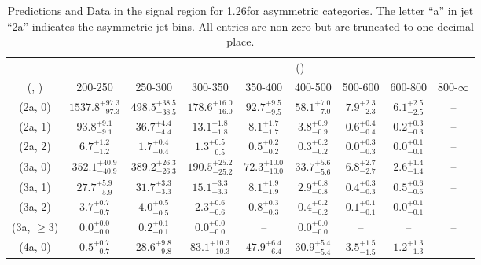 \begin{table}[h!]
\tiny
\centering
\caption{Predictions and Data in the signal region for 1.26\ifb for asymmetric categories. The letter ``a'' in jet \eg ``2a''  indicates the asymmetric jet bins. All entries are non-zero but are truncated to one decimal place.\label{tab:yieldsseppost_sig_zinv_asym}}
\begin{tabular}
{ccccccccc}
	\hline\hline
&	& \multicolumn{8}{c}{\scalht (\gev)} \\ 
	 (\njet,  \nb) & 200-250 & 250-300 & 300-350 & 350-400 & 400-500 & 500-600 & 600-800 & 800-$\infty$ \\ [0.8ex] 
\hline
	(2a, 0) & $1537.8^{+ 97.3 }_{- 97.3 }$ & $498.5^{+ 38.5 }_{- 38.5 }$ & $178.6^{+ 16.0 }_{- 16.0 }$ & $92.7^{+ 9.5 }_{- 9.5 }$ & $58.1^{+ 7.0 }_{- 7.0 }$ & $7.9^{+ 2.3 }_{- 2.3 }$ & $6.1^{+ 2.5 }_{- 2.5 }$ & -- \\[0.5ex] 
	(2a, 1) & $93.8^{+ 9.1 }_{- 9.1 }$ & $36.7^{+ 4.4 }_{- 4.4 }$ & $13.1^{+ 1.8 }_{- 1.8 }$ & $8.1^{+ 1.7 }_{- 1.7 }$ & $3.8^{+ 0.9 }_{- 0.9 }$ & $0.6^{+ 0.4 }_{- 0.4 }$ & $0.2^{+ 0.3 }_{- 0.3 }$ & -- \\[0.5ex] 
	(2a, 2) & $6.7^{+ 1.2 }_{- 1.2 }$ & $1.7^{+ 0.4 }_{- 0.4 }$ & $1.3^{+ 0.5 }_{- 0.5 }$ & $0.5^{+ 0.2 }_{- 0.2 }$ & $0.3^{+ 0.2 }_{- 0.2 }$ & $0.0^{+ 0.3 }_{- 0.3 }$ & $0.0^{+ 0.1 }_{- 0.1 }$ & -- \\[0.5ex] 
	(3a, 0) & $352.1^{+ 40.9 }_{- 40.9 }$ & $389.2^{+ 26.3 }_{- 26.3 }$ & $190.5^{+ 25.2 }_{- 25.2 }$ & $72.3^{+ 10.0 }_{- 10.0 }$ & $33.7^{+ 5.6 }_{- 5.6 }$ & $6.8^{+ 2.7 }_{- 2.7 }$ & $2.6^{+ 1.4 }_{- 1.4 }$ & -- \\[0.5ex] 
	(3a, 1) & $27.7^{+ 5.9 }_{- 5.9 }$ & $31.7^{+ 3.3 }_{- 3.3 }$ & $15.1^{+ 3.3 }_{- 3.3 }$ & $8.1^{+ 1.9 }_{- 1.9 }$ & $2.9^{+ 0.8 }_{- 0.8 }$ & $0.4^{+ 0.3 }_{- 0.3 }$ & $0.5^{+ 0.6 }_{- 0.6 }$ & -- \\[0.5ex] 
	(3a, 2) & $3.7^{+ 0.7 }_{- 0.7 }$ & $4.0^{+ 0.5 }_{- 0.5 }$ & $2.3^{+ 0.6 }_{- 0.6 }$ & $0.8^{+ 0.3 }_{- 0.3 }$ & $0.4^{+ 0.2 }_{- 0.2 }$ & $0.1^{+ 0.1 }_{- 0.1 }$ & $0.0^{+ 0.1 }_{- 0.1 }$ & -- \\[0.5ex] 
	(3a, $\ge3$) & $0.0^{+ 0.0 }_{- 0.0 }$ & $0.2^{+ 0.1 }_{- 0.1 }$ & $0.0^{+ 0.0 }_{- 0.0 }$ & -- & $0.0^{+ 0.0 }_{- 0.0 }$ & -- & -- & -- \\[0.5ex] 
	(4a, 0) & $0.5^{+ 0.7 }_{- 0.7 }$ & $28.6^{+ 9.8 }_{- 9.8 }$ & $83.1^{+ 10.3 }_{- 10.3 }$ & $47.9^{+ 6.4 }_{- 6.4 }$ & $30.9^{+ 5.4 }_{- 5.4 }$ & $3.5^{+ 1.5 }_{- 1.5 }$ & $1.2^{+ 1.3 }_{- 1.3 }$ & -- \\[0.5ex] 

\end{tabular}
\end{table}

